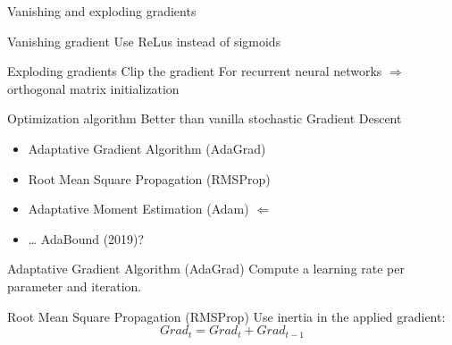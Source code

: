 \begin{frame}{Vanishing and exploding gradients}
\end{frame}

\begin{frame}{Vanishing gradient}
  Use ReLus instead of sigmoids
  \vfill
\end{frame}

\begin{frame}{Exploding gradients}
  Clip the gradient
  For recurrent neural networks $\Rightarrow$ orthogonal matrix initialization
\end{frame}

\begin{frame}{Optimization algorithm}
  Better than vanilla stochastic Gradient Descent
  \begin{itemize}[<+(1)->]
    \item Adaptative Gradient Algorithm (AdaGrad)
    \item Root Mean Square Propagation (RMSProp)
    \item Adaptative Moment Estimation (Adam)    $\Leftarrow$
    \item … AdaBound (2019)?
  \end{itemize}
\end{frame}

\begin{frame}{Adaptative Gradient Algorithm (AdaGrad)}
  Compute a learning rate per parameter and iteration.
\end{frame}

\begin{frame}{Root Mean Square Propagation (RMSProp)}
  Use inertia in the applied gradient:
  $$
    Grad_t = Grad_t + Grad_{t-1}
  $$
\end{frame}
